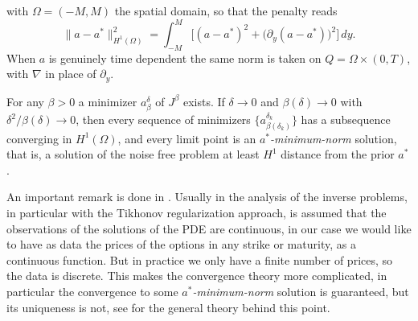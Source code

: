 with $\Omega = (-M,M)$ the spatial domain, so that the penalty reads
\begin{equation*}
    \|a - a^*\|^2_{H^1(\Omega)}
        = \int_{-M}^{M} \bigl[(a-a^*)^2 + \bigl(\partial_y(a-a^*)\bigr)^2\bigr]\,dy.
\end{equation*}
When $a$ is genuinely time dependent the same norm is taken on $Q = \Omega\times(0,T)$,
with $\nabla$ in place of $\partial_y$.

\begin{proposition}
\label{prop:tikhonov_convergence}
For any $\beta > 0$ a minimizer $a^\delta_\beta$ of $J^\beta$ exists.
If $\delta \to 0$ and $\beta(\delta) \to 0$ with $\delta^2/\beta(\delta) \to 0$,
then every sequence of minimizers $\{a^{\delta_k}_{\beta(\delta_k)}\}$
has a subsequence converging in $H^1(\Omega)$,
and every limit point is an \emph{$a^*$-minimum-norm} solution,
that is, a solution of the noise free problem at least $H^1$ distance from the prior $a^*$.
\end{proposition}


An important remark is done in \cite{egger2005tikhonov}.
Usually in the analysis of the inverse problems,
in particular with the Tikhonov regularization approach,
is assumed that the observations of the solutions of the PDE are continuous,
in our case we would like to have as data the prices of the options in any strike or maturity,
as a continuous function.
But in practice we only have a finite number of prices, so the data is discrete.
This makes the convergence theory more complicated,
in particular the convergence to some \emph{$a^*$-minimum-norm} solution is guaranteed,
but its uniqueness is not,
see \cite[Ch.~10 and 11]{engl_hanke_neubauer} for the general theory behind this point.

